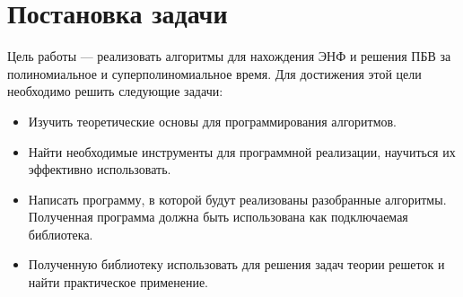 \newpage

\section{Постановка задачи}

Цель работы --- реализовать алгоритмы для нахождения ЭНФ и решения ПБВ за полиномиальное и суперполиномиальное время. Для достижения этой цели необходимо решить следующие задачи:
\begin{itemize}
\item Изучить теоретические основы для программирования алгоритмов.
\item Найти необходимые инструменты для программной реализации, научиться их эффективно использовать.
\item Написать программу, в которой будут реализованы разобранные алгоритмы. Полученная программа должна быть использована как подключаемая библиотека.
\item Полученную библиотеку использовать для решения задач теории решеток и найти практическое применение.
\end{itemize}  

\clearpage